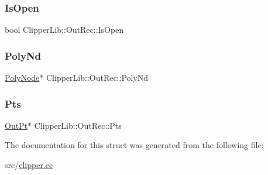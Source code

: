 \mbox{\label{struct_clipper_lib_1_1_out_rec_a065731c084453a818939c219868a2fcc}} 
\subsubsection{\texorpdfstring{IsOpen}{IsOpen}}
{\footnotesize\ttfamily bool Clipper\+Lib\+::\+Out\+Rec\+::\+Is\+Open}

\mbox{\label{struct_clipper_lib_1_1_out_rec_a334af720a9e0a815ba690e80e32bebd1}} 
\subsubsection{\texorpdfstring{PolyNd}{PolyNd}}
{\footnotesize\ttfamily \mbox{\hyperlink{class_clipper_lib_1_1_poly_node}{Poly\+Node}}$\ast$ Clipper\+Lib\+::\+Out\+Rec\+::\+Poly\+Nd}

\mbox{\label{struct_clipper_lib_1_1_out_rec_a82e9cba88d46d0d60db0b0365c6bd02e}} 
\subsubsection{\texorpdfstring{Pts}{Pts}}
{\footnotesize\ttfamily \mbox{\hyperlink{struct_clipper_lib_1_1_out_pt}{Out\+Pt}}$\ast$ Clipper\+Lib\+::\+Out\+Rec\+::\+Pts}



The documentation for this struct was generated from the following file\+:\begin{DoxyCompactItemize}
\item 
src/\mbox{\hyperlink{clipper_8cc}{clipper.\+cc}}\end{DoxyCompactItemize}
